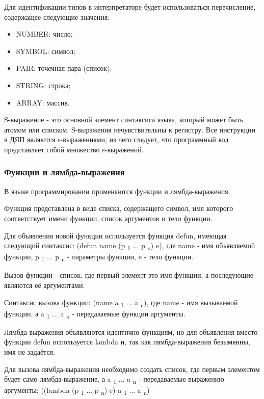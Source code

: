 Для идентификации типов в интерпретаторе будет использоваться перечисление, содержащее следующие значения:
\begin{itemize}
	\item NUMBER: число;
	\item SYMBOL: символ;
	\item PAIR: точечная пара (список);
	\item STRING: строка;
	\item ARRAY: массив.
\end{itemize}

S-выражение - это основной элемент синтаксиса языка, который может быть атомом или списком. S-выражения нечувствительны к регистру. Все инструкции в ДЯП являются s-выражениями, из чего следует, что программный код представляет собой множество s-выражений.

\subsubsection{Функции и лямбда-выражения}

В языке программировании применяются функции и лямбда-выражения.

Функция представлена в виде списка, содержащего символ, имя которого соответствует имени функции, список аргументов и тело функции.

Для объявления новой функции используется функция defun, имеющая следующий синтаксис:
(defun name (p \textsubscript 1 ... p \textsubscript n) e), где name - имя объявляемой функции, p \textsubscript 1 ... p \textsubscript n - параметры функции, e - тело функции.

Вызов функции - список, где первый элемент это имя функции, а последующие являются её аргументами.

Синтаксис вызова функции:
(name a \textsubscript 1 ... a \textsubscript n), где name - имя вызываемой функции, а a \textsubscript 1 ... a \textsubscript n - передаваемые функции аргументы.

Лямбда-выражения объявляются идентично функциям, но для объявления вместо функции defun используется lambda и, так как лямбда-выражения безымянны, имя не задаётся.

Для вызова лямбда-выражения необходимо создать список, где первым элементом будет само лямбда-выражение, а a \textsubscript 1 ... a \textsubscript n - передаваемые выражению аргументы: 
((lambda (p \textsubscript 1 ... p \textsubscript n) e) a \textsubscript 1 ... a \textsubscript n)

